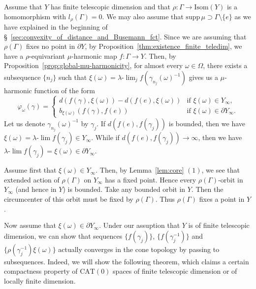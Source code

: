 \documentclass[12pt]{amsart}
\numberwithin{equation}{section}
\theoremstyle{plain}
\theoremstyle{definition}
\theoremstyle{remark}
\newcommand{\isom}[1]{\mathrm{Isom}({#1})}
\newcommand{\cat}[1]{\mathrm{CAT}(#1)}
\newcommand{\ulim}{\lambda{\text{-}}\!\lim}
\newcommand{\supp}{\mathrm{supp}\,}
\begin{document}
 Assume that 
 $Y$ has finite telescopic dimension and that
 $\rho \colon \Gamma \rightarrow \isom{Y}$
 is a homomorphism with $l_{\rho}(\Gamma)=0$. 
 We may also assume that $\supp \mu \supset \Gamma \setminus \{e\}$ as
 we have explained in the 
 beginning of
 \S~\ref{sec:convexity_of_distance_and_Busemann_fct}. 
 Since we are assuming that $\rho(\Gamma)$ fixes no point in 
 $\partial Y$, by Proposition~\ref{thm:existence_finite_teledim}, we have a
 $\rho$-equivariant $\mu$-harmonic map $f\colon \Gamma\rightarrow Y$. 
  Then, by Proposition~\ref{prop:global-mu-harmonicity}, for almost
 every $\omega \in \Omega$,  there exists a subsequence $\{n_j\}$
 such that  $\xi(\omega)=\ulim_j f(\gamma_{n_j}(\omega)^{-1})$ gives us
 a $\mu$-harmonic function of the form
\begin{equation*}
  \varphi_{\omega}(\gamma)=
 \begin{cases}
   d(f(\gamma),\xi(\omega)) - d(f(e),\xi(\omega)) & \text{if } 
  \xi(\omega) \in Y_{\infty}, \\
   b_{\xi(\omega)}(f(\gamma),f(e)) & \text{if } 
  \xi(\omega) \in \partial Y_{\infty}. 
 \end{cases}
\end{equation*}
 Let us denote $\gamma_{n_j}(\omega)^{-1}$ by $\gamma_j$. 
 If $d(f(e),f(\gamma_j))$ is bounded, then we have 
 $\xi(\omega)= \ulim f(\gamma_j) \in Y_{\infty}$. 
 While if $d(f(e),f(\gamma_j))\to \infty$, then we have 
 $\ulim f(\gamma_j) = \xi (\omega) \in \partial Y_{\infty}$. 

%
%
 Assume first that  $\xi(\omega) \in Y_{\infty}$. 
 Then, by Lemma~\ref{lem:core} $(1)$,
 we see that extended action of $\rho(\Gamma)$ on $Y_{\infty}$ has
 a fixed point.
 Hence every $\rho(\Gamma)$-orbit in $Y_{\infty}$ (and hence in $Y$) is
 bounded.  
 Take any bounded orbit in $Y$. 
 Then the circumcenter of this orbit must be fixed by $\rho(\Gamma)$.
 Thus $\rho(\Gamma)$ fixes a point in $Y$. 

%
%
 Now assume that $\xi(\omega) \in \partial Y_{\infty}$. 
 Under our assuption that $Y$ 
 is of finite telescopic dimension, we can
 show that sequences $\{f(\gamma_j)\}$, $\{f(\gamma_j^{-1})\}$ and
 $\{\rho(\gamma_j^{-1})\xi(\omega)\}$ actually converges in the cone
 topology by passing to subsequences.  
 Indeed, we will show the following theorem, which claims a certain
 compactness property of $\cat{0}$ spaces of finite telescopic dimension
 or of locally finite dimension. 
\end{document}
